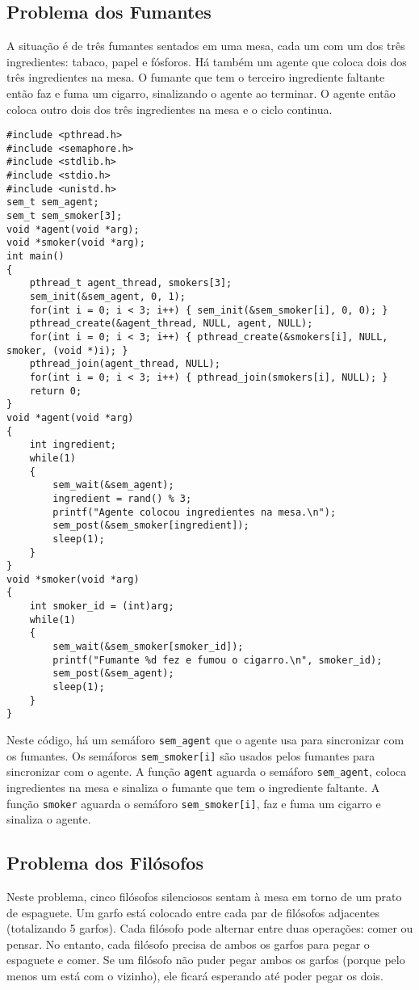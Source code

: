 \documentclass[10pt]{article}
\begin{document}
\subsection{Problema dos Fumantes}
A situação é de três fumantes sentados em uma mesa, cada um com um dos três ingredientes: tabaco, papel e fósforos. Há também um agente que coloca dois dos três ingredientes na mesa. O fumante que tem o terceiro ingrediente faltante então faz e fuma um cigarro, sinalizando o agente ao terminar. O agente então coloca outro dois dos três ingredientes na mesa e o ciclo continua.
\begin{lstlisting}
#include <pthread.h>
#include <semaphore.h>
#include <stdlib.h>
#include <stdio.h>
#include <unistd.h>
sem_t sem_agent;
sem_t sem_smoker[3];
void *agent(void *arg);
void *smoker(void *arg);
int main()
{
    pthread_t agent_thread, smokers[3];
    sem_init(&sem_agent, 0, 1);
    for(int i = 0; i < 3; i++) { sem_init(&sem_smoker[i], 0, 0); }
    pthread_create(&agent_thread, NULL, agent, NULL);
    for(int i = 0; i < 3; i++) { pthread_create(&smokers[i], NULL, smoker, (void *)i); }
    pthread_join(agent_thread, NULL);
    for(int i = 0; i < 3; i++) { pthread_join(smokers[i], NULL); }
    return 0;
}
void *agent(void *arg)
{
    int ingredient;
    while(1)
    {
        sem_wait(&sem_agent);
        ingredient = rand() % 3;
        printf("Agente colocou ingredientes na mesa.\n");
        sem_post(&sem_smoker[ingredient]);
        sleep(1);
    }
}
void *smoker(void *arg)
{
    int smoker_id = (int)arg;
    while(1)
    {
        sem_wait(&sem_smoker[smoker_id]);
        printf("Fumante %d fez e fumou o cigarro.\n", smoker_id);
        sem_post(&sem_agent);
        sleep(1);
    }
}
\end{lstlisting}
Neste código, há um semáforo \verb|sem_agent| que o agente usa para sincronizar com os fumantes. Os semáforos \verb|sem_smoker[i]| são usados pelos fumantes para sincronizar com o agente.
A função \verb|agent| aguarda o semáforo \verb|sem_agent|, coloca ingredientes na mesa e sinaliza o fumante que tem o ingrediente faltante.
A função \verb|smoker| aguarda o semáforo \verb|sem_smoker[i]|, faz e fuma um cigarro e sinaliza o agente.
\subsection{Problema dos Filósofos}
Neste problema, cinco filósofos silenciosos sentam à mesa em torno de um prato de espaguete. Um garfo está colocado entre cada par de filósofos adjacentes (totalizando 5 garfos). Cada filósofo pode alternar entre duas operações: comer ou pensar. No entanto, cada filósofo precisa de ambos os garfos para pegar o espaguete e comer. Se um filósofo não puder pegar ambos os garfos (porque pelo menos um está com o vizinho), ele ficará esperando até poder pegar os dois.
\end{document}
